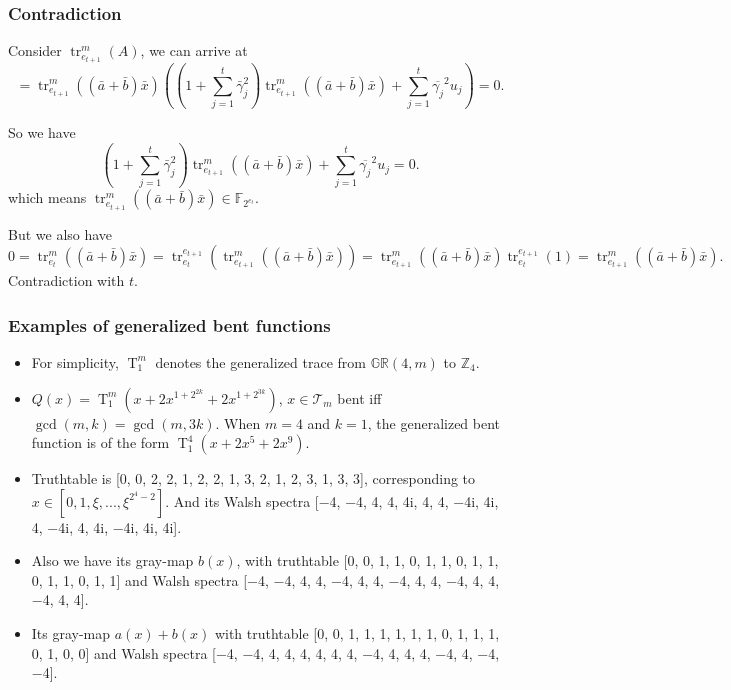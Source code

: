 \documentclass[
    aspectratio=169,                   %
]{beamer}
\newcommand{\Z}{\mathbb{Z}}
\newcommand{\GR}{\mathbb{GR}}
\newcommand{\F}{\mathbb{F}}
\newcommand{\tr}{\operatorname{tr}}
\newcommand{\gtr}{\operatorname{T}}
\begin{document}
    \begin{frame}
        \frametitle{Contradiction}
    
        Consider $ \tr_{e_{t+1}}^m(A) $, we can arrive at 
        \[=\tr_{e_{t+1}}^{m}((\bar{a}+\bar{b}) \bar{x})\left(\left(1+\sum_{j=1}^{t} \bar{\gamma}_{j}^{2}\right) \tr_{e_{t+1}}^{m}((\bar{a}+\bar{b}) \bar{x})+\sum_{j=1}^{t} \overline{\gamma_{j}}^{2} u_{j}\right)=0.\]
    
        So we have 
        \[\left(1+\sum_{j=1}^{t} \bar{\gamma}_{j}^{2}\right) \tr_{e_{t+1}}^{m}((\bar{a}+\bar{b}) \bar{x})+\sum_{j=1}^{t} \overline{\gamma_{j}}^{2} u_{j}=0.\]
        which means $ \tr_{e_{t+1}}^{m}((\bar{a}+\bar{b}) \bar{x})\in\F_{2^{e_t}} $.

        But we also have 
        \[0=\operatorname{tr}_{e_{t}}^{m}((\bar{a}+\bar{b}) \bar{x})=\operatorname{tr}_{e_{t}}^{e_{t+1}}\left(\operatorname{tr}_{e_{t+1}}^{m}((\bar{a}+\bar{b}) \bar{x})\right)=\operatorname{tr}_{e_{t+1}}^{m}((\bar{a}+\bar{b}) \bar{x}) \operatorname{tr}_{e_{t}}^{e_{t+1}}(1)=\operatorname{tr}_{e_{t+1}}^{m}((\bar{a}+\bar{b}) \bar{x}).\] Contradiction with $ t $.
    \end{frame}
    \begin{frame}
        \frametitle{Examples of generalized bent functions}
        \begin{itemize} 
            \item For simplicity, $ \gtr_1^m $ denotes the generalized trace from $ \GR(4,m) $ to $ \Z_4 $. 
            \item $ Q(x)=\gtr_1^m(x+2x^{1+2^{2k}}+2x^{1+2^{3k}}) $, $ x\in \mathcal{T}_m $ bent iff $ \gcd(m,k)=\gcd(m,3k) $. When $ m=4 $ and $ k=1 $, the generalized bent function is of the form $ \gtr_1^4(x+2x^5+2x^9) $. 
            \item Truthtable is [0, 0, 2, 2, 1, 2, 2, 1, 3, 2, 1, 2, 3, 1, 3, 3], corresponding to $ x\in [0,1,\xi,...,\xi^{2^4-2}] $. And its Walsh spectra [−4, −4, 4, 4, 4i, 4, 4, −4i, 4i, 4, −4i, 4, 4i, −4i, 4i, 4i].
            \item Also we have its gray-map $ b(x) $, with truthtable [0, 0, 1, 1, 0, 1, 1, 0, 1, 1, 0, 1, 1, 0, 1, 1] and Walsh spectra 
            [−4, −4, 4, 4, −4, 4, 4, −4, 4, 4, −4, 4, 4, −4, 4, 4].
            \item Its gray-map $ a(x)+b(x) $ with truthtable [0, 0, 1, 1, 1, 1, 1, 1, 0, 1, 1, 1, 0, 1, 0, 0] and Walsh spectra [−4, −4, 4, 4, 4, 4, 4, 4, −4, 4, 4, 4, −4, 4, −4, −4].
        \end{itemize}
    \end{frame}
\end{document}
